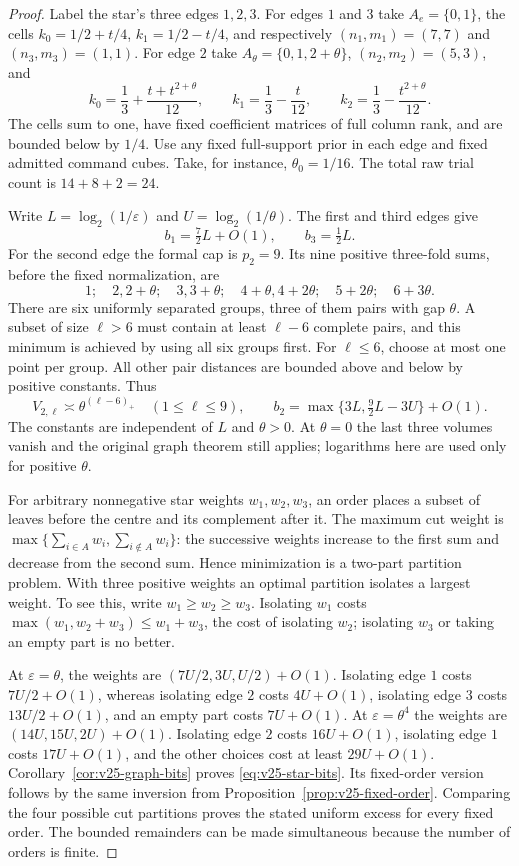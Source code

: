 \begin{proof}
Label the star's three edges $1,2,3$. For edges $1$ and $3$ take
$A_e=\{0,1\}$, the cells
$k_0=1/2+t/4$, $k_1=1/2-t/4$, and respectively
$(n_1,m_1)=(7,7)$ and $(n_3,m_3)=(1,1)$.
For edge $2$ take $A_\theta=\{0,1,2+\theta\}$,
$(n_2,m_2)=(5,3)$, and
\[
 k_0=\frac13+\frac{t+t^{2+\theta}}{12},\qquad
 k_1=\frac13-\frac{t}{12},\qquad
 k_2=\frac13-\frac{t^{2+\theta}}{12}.
\]
The cells sum to one, have fixed coefficient matrices of full column
rank, and are bounded below by $1/4$. Use any fixed full-support prior
in each edge and fixed admitted command cubes. Take, for instance,
$\theta_0=1/16$. The total raw trial count is $14+8+2=24$.

Write $L=\log_2(1/\varepsilon)$ and $U=\log_2(1/\theta)$.
The first and third edges give
\[
 b_1=\tfrac72L+O(1),\qquad b_3=\tfrac12L.
\]
For the second edge the formal cap is $p_2=9$. Its nine positive
three-fold sums, before the fixed normalization, are
\[
 1;\quad 2,2+\theta;\quad 3,3+\theta;\quad
 4+\theta,4+2\theta;\quad 5+2\theta;\quad 6+3\theta.
\]
There are six uniformly separated groups, three of them pairs with
gap $\theta$. A subset of size $\ell>6$ must contain at least
$\ell-6$ complete pairs, and this minimum is achieved by using all
six groups first. For $\ell\le6$, choose at most one point per group.
All other pair distances are bounded above and below by positive
constants. Thus
\[
 V_{2,\ell}\asymp\theta^{(\ell-6)_+}\quad(1\le\ell\le9),\qquad
 b_2=\max\{3L,\tfrac92L-3U\}+O(1).
\]
The constants are independent of $L$ and $\theta>0$. At $\theta=0$
the last three volumes vanish and the original graph theorem still
applies; logarithms here are used only for positive $\theta$.

For arbitrary nonnegative star weights $w_1,w_2,w_3$, an order places
a subset of leaves before the centre and its complement after it.
The maximum cut weight is
$\max\{\sum_{i\in A}w_i,\sum_{i\notin A}w_i\}$: the successive
weights increase to the first sum and decrease from the second sum.
Hence minimization is a two-part partition problem. With three positive
weights an optimal partition isolates a largest weight. To see this,
write $w_1\ge w_2\ge w_3$. Isolating $w_1$ costs
$\max(w_1,w_2+w_3)\le w_1+w_3$, the cost of isolating $w_2$;
isolating $w_3$ or taking an empty part is no better.

At $\varepsilon=\theta$, the weights are
$(7U/2,3U,U/2)+O(1)$. Isolating edge $1$ costs $7U/2+O(1)$,
whereas isolating edge $2$ costs $4U+O(1)$, isolating edge $3$ costs
$13U/2+O(1)$, and an empty part costs $7U+O(1)$.
At $\varepsilon=\theta^4$ the weights are
$(14U,15U,2U)+O(1)$. Isolating edge $2$ costs $16U+O(1)$,
isolating edge $1$ costs $17U+O(1)$, and the other choices cost at
least $29U+O(1)$. Corollary~\ref{cor:v25-graph-bits} proves
\eqref{eq:v25-star-bits}. Its fixed-order version follows by the same
inversion from Proposition~\ref{prop:v25-fixed-order}. Comparing the
four possible cut partitions proves the stated uniform excess for
every fixed order. The bounded remainders can be made simultaneous
because the number of orders is finite.
\end{proof}

